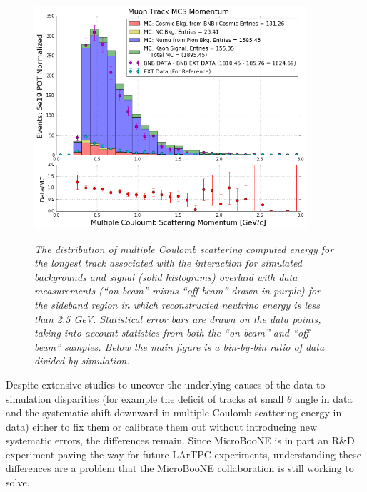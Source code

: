 \begin{figure}[ht!]
\centering
	\includegraphics[width=0.9\textwidth]{Figures/kaon_sideband_comp_MCS.png} \\
\caption{\textit{The distribution of multiple Coulomb scattering computed energy for the longest track associated with the interaction for simulated backgrounds and signal (solid histograms) overlaid with data measurements (``on-beam'' minus ``off-beam'' drawn in purple) for the sideband region in which reconstructed neutrino energy is less than 2.5 GeV. Statistical error bars are drawn on the data points, taking into account statistics from both the ``on-beam'' and ``off-beam'' samples. Below the main figure is a bin-by-bin ratio of data divided by simulation.}}\label{kaon_sideband_comp_MCS}
\end{figure}


Despite extensive studies to uncover the underlying causes of the data to simulation disparities (for example the deficit of tracks at small $\theta$ angle in data and the systematic shift downward in multiple Coulomb scattering energy in data) either to fix them or calibrate them out without introducing new systematic errors, the differences remain. Since MicroBooNE is in part an R\&D experiment paving the way for future LArTPC experiments, understanding these differences are a problem that the MicroBooNE collaboration is still working to solve.\\

